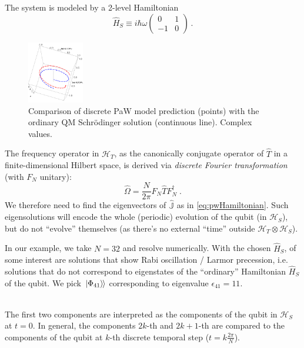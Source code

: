 \documentclass[a0,portrait]{a0poster}
\newcommand{\hilb}[1]{\mathcal{#1}}       %
\newcommand{\ox}{\otimes}
\DeclareMathOperator*{\repr}{\equiv}      %
\newcommand{\smallback}{\hspace{-0.115em}}
\newcommand{\dket}[1]{\left.\left| #1 \right\rangle\smallback\right\rangle}
\begin{document}
\begin{multicols}{2}
The system is modeled by a 2-level Hamiltonian
\[
  \hat{H}_S \repr
  i \hbar \omega
  \begin{pmatrix}
    0   & 1   \\
    -1  & 0
  \end{pmatrix}
  \, \text{.}
\]

\begin{figure}
  \begin{center}
    \includegraphics[width=0.22\textwidth]{PWfit32top-largelabels.png}
  \end{center}
  \caption{
    \color{Green}
    Comparison of discrete PaW model prediction (points) with the ordinary QM Schr\"odinger solution (continuous line).
    Complex values.
  }
\end{figure}

The frequency operator in $\hilb{H}_T$, as the canonically conjugate operator
of $\hat{T}$ in a finite-dimensional Hilbert space, is derived via
\emph{discrete Fourier transformation} \cite{FiniteHilb} (with $F_N$ unitary):
\begin{equation}
  \boxed{
    \hat{\Omega} = \frac{N}{2\pi} F^{}_{N} \hat{T} F^{\dagger}_{N}
  }
  \; \text{.}
\end{equation}
%
We therefore need to find the eigenvectors of $\hat{\mathbb{J}}$ as in \eqref{eq:pwHamiltonian}.
Such eigensolutions
will encode the whole (periodic) evolution of the qubit (in $\hilb{H}_S$), but do
not ``evolve'' themselves (as there's no external ``time'' outside $\hilb{H}_T \ox \hilb{H}_S$).

In our example, we take $N = 32$ and resolve numerically.
With the chosen $\hat{H}_S$,
of some interest are solutions that show
Rabi oscillation / Larmor precession,
i.e. solutions that do not correspond to eigenstates of
the ``ordinary'' Hamiltonian $\hat{H}_S$ of the qubit.
%
We pick $\dket{\Phi_{41}}$ corresponding to eigenvalue
$\epsilon_{41} = 11$.

\,\\

The first two components
are interpreted as the components of the qubit in $\hilb{H}_S$ at $t=0$.
In general, the components
$2k$\nobreakdash-th and $2k+1$\nobreakdash-th
are compared to the components of the qubit at $k$-th discrete temporal step ($t = k \frac{2\pi}{N}$).


\end{multicols}
\end{document}
